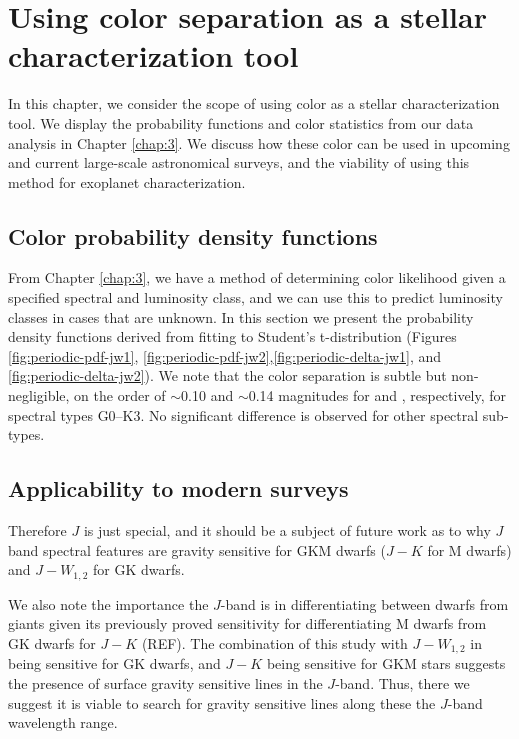 \chapter{Using color separation as a stellar characterization tool}\label{chap:4}

In this chapter, we consider the scope of using color as a stellar characterization tool. We display the probability functions and color statistics from our data analysis in Chapter \ref{chap:3}. We discuss how these color can be used in upcoming and current large-scale astronomical surveys, and the viability of using this method for exoplanet characterization.

\section{Color probability density functions}

From Chapter \ref{chap:3}, we have a method of determining color likelihood given a specified spectral and luminosity class, and we can use this to predict luminosity classes in cases that are unknown. In this section we present the probability density functions derived from fitting to Student's t-distribution (Figures \ref{fig:periodic-pdf-jw1}, \ref{fig:periodic-pdf-jw2},\ref{fig:periodic-delta-jw1}, and \ref{fig:periodic-delta-jw2}). We note that the color separation is subtle but non-negligible, on the order of $\sim$0.10 and $\sim$0.14 magnitudes for \jwone and \jwtwo, respectively, for spectral types G0--K3. No significant difference is observed for other spectral sub-types.

\section{Applicability to modern surveys}
Therefore $J$ is just special, and it should be a subject of future work as to why $J$ band spectral features are gravity sensitive for GKM dwarfs ($J-K$ for M dwarfs) and $J-W_{1,2}$ for GK dwarfs.

We also note the importance the $J$-band is in differentiating between dwarfs from giants given its previously proved sensitivity for differentiating M dwarfs from GK dwarfs for $J-K$ (REF). The combination of this study with $J-W_{1,2}$ in being sensitive for GK dwarfs, and $J-K$ being sensitive for GKM stars suggests the presence of surface gravity sensitive lines in the $J$-band. Thus, there we suggest it is viable to search for gravity sensitive lines along these the $J$-band wavelength range.

